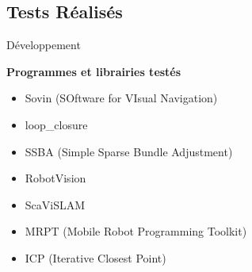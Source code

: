 \documentclass{beamer}
\begin{document}
\subsection*{Tests Réalisés}
\begin{frame}{Développement}
  \begin{center}
    \begin{Large}
      \textbf{Programmes et librairies testés}
    \end{Large}
  \end{center}
  \begin{itemize}
  \item Sovin (SOftware for VIsual Navigation)
  \item loop\_closure
  \item SSBA (Simple Sparse Bundle Adjustment)
  \item RobotVision
  \item ScaViSLAM
  \item MRPT (Mobile Robot Programming Toolkit)
  \item ICP (Iterative Closest Point)
  \end{itemize}
\end{frame}
\end{document}
